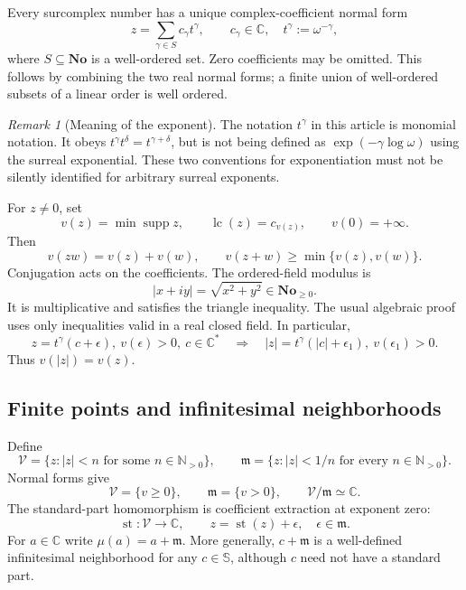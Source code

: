 \documentclass[11pt,a4paper]{article}
\theoremstyle{definition}
\theoremstyle{remark}
\newtheorem{remark}[theorem]{Remark}
\newcommand{\No}{\mathbf{No}}
\newcommand{\SC}{\mathbb S}
\newcommand{\C}{\mathbb C}
\newcommand{\N}{\mathbb N}
\newcommand{\mm}{\mathfrak m}
\newcommand{\Fin}{\mathcal V}
\newcommand{\supp}{\operatorname{supp}}
\newcommand{\st}{\operatorname{st}}
\newcommand{\LC}{\operatorname{lc}}
\begin{document}
Every surcomplex number has a unique complex-coefficient normal form
\begin{equation}\label{eq:normal}
 z=\sum_{\gamma\in S}c_\gamma t^\gamma,
 \qquad c_\gamma\in\C,\quad
 t^\gamma:=\omega^{-\gamma},
\end{equation}
where $S\subseteq\No$ is a well-ordered set. Zero coefficients may be
omitted. This follows by combining the two real normal forms; a finite
union of well-ordered subsets of a linear order is well ordered.

\begin{remark}[Meaning of the exponent]
The notation $t^\gamma$ in this article is monomial notation. It obeys
$t^\gamma t^\delta=t^{\gamma+\delta}$, but is not being defined as
$\exp(-\gamma\log\omega)$ using the surreal exponential. These two
conventions for exponentiation must not be silently identified for
arbitrary surreal exponents.
\end{remark}

For $z\ne0$, set
\[
 v(z)=\min\supp z,\qquad \LC(z)=c_{v(z)},\qquad v(0)=+\infty.
\]
Then
\begin{equation}\label{eq:valuation}
 v(zw)=v(z)+v(w),\qquad
 v(z+w)\ge\min\{v(z),v(w)\}.
\end{equation}
Conjugation acts on the coefficients. The ordered-field modulus is
\[
 |x+iy|=\sqrt{x^2+y^2}\in\No_{\ge0}.
\]
It is multiplicative and satisfies the triangle inequality. The usual
algebraic proof uses only inequalities valid in a real closed field.
In particular,
\begin{equation}\label{eq:modulusleading}
 z=t^\gamma(c+\epsilon),\ v(\epsilon)>0,\ c\in\C^*
 \quad\Longrightarrow\quad
 |z|=t^\gamma(|c|+\epsilon_1),\ v(\epsilon_1)>0.
\end{equation}
Thus $v(|z|)=v(z)$.

\subsection{Finite points and infinitesimal neighborhoods}
Define
\[
 \Fin=\{z:|z|<n\text{ for some }n\in\N_{>0}\},\qquad
 \mm=\{z:|z|<1/n\text{ for every }n\in\N_{>0}\}.
\]
Normal forms give
\[
 \Fin=\{v\ge0\},\qquad \mm=\{v>0\},\qquad
 \Fin/\mm\simeq\C.
\]
The standard-part homomorphism is coefficient extraction at exponent
zero:
\[
 \st:\Fin\longrightarrow\C,
 \qquad z=\st(z)+\epsilon,\quad\epsilon\in\mm.
\]
For $a\in\C$ write $\mu(a)=a+\mm$. More generally, $c+\mm$ is a
well-defined infinitesimal neighborhood for any $c\in\SC$, although
$c$ need not have a standard part.
\end{document}
